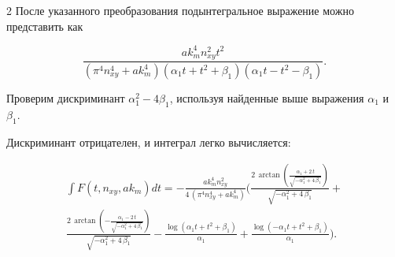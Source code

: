 \documentclass[twoside, 10pt]{article}
\begin{document}
\begin{multicols}{2}
    После указанного преобразования подынтегральное выражение можно представить как

    \[\frac{\mathit{ak}_{m}^{4} n_{\mathit{xy}}^{2} t^{2}}{{\left(\pi^{4} n_{\mathit{xy}}^{4} + \mathit{ak}_{m}^{4}\right)} {\left(\alpha_{1} t + t^{2} + \beta_{1}\right)} {\left(\alpha_{1} t - t^{2} - \beta_{1}\right)}}.\]

    Проверим дискриминант \(\alpha_1^2 - 4\beta_1\), используя найденные выше выражения \(\alpha_1\) и \(\beta_1\).

    Дискриминант отрицателен, и интеграл легко вычисляется:

\noindent
    \[\begin{array}{r} \int F\left(t, n_{xy}, ak_m\right) dt = -\frac{\mathit{ak}_{m}^{4} n_{\mathit{xy}}^{2}}{4 \, {\left(\pi^{4} n_{\mathit{xy}}^{4} + \mathit{ak}_{m}^{4}\right)}} \Bigg(\frac{2 \, \arctan\left(\frac{\alpha_{1} + 2 \, t}{\sqrt{-\alpha_{1}^{2} + 4 \, \beta_{1}}}\right)}{\sqrt{-\alpha_{1}^{2} + 4 \, \beta_{1}}} + \\ \frac{2 \, \arctan\left(-\frac{\alpha_{1} - 2 \, t}{\sqrt{-\alpha_{1}^{2} + 4 \, \beta_{1}}}\right)}{\sqrt{-\alpha_{1}^{2} + 4 \, \beta_{1}}} - \frac{\log\left(\alpha_{1} t + t^{2} + \beta_{1}\right)}{\alpha_{1}} + \frac{\log\left(-\alpha_{1} t + t^{2} + \beta_{1}\right)}{\alpha_{1}}\Bigg). \end{array}\]




\end{multicols}
\end{document}
